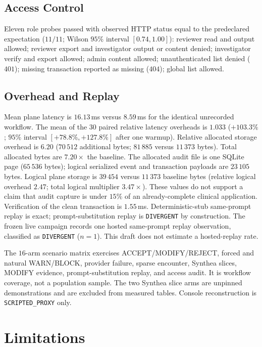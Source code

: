 \documentclass[journal]{IEEEtran}
\begin{document}
\subsection{Access Control}
Eleven role probes passed with observed HTTP status equal to the predeclared
expectation ($11/11$; Wilson $95\%$ interval $[0.74, 1.00]$): reviewer read and
output allowed; reviewer export and investigator output or content denied;
investigator verify and export allowed; admin content allowed;
unauthenticated list denied ($401$); missing transaction reported as missing
($404$); global list allowed.

\subsection{Overhead and Replay}
Mean plane latency is $16.13$\,ms versus $8.59$\,ms for the identical
unrecorded workflow. The mean of the $30$ paired relative latency overheads is
$1.033$ ($+103.3\%$; $95\%$ interval $[+78.8\%, +127.8\%]$ after one
warmup). Relative allocated storage
overhead is $6.20$ ($70\,512$ additional bytes; $81\,885$ versus
$11\,373$ bytes). Total allocated bytes are $7.20\times$ the baseline.
The allocated audit file is one SQLite page ($65\,536$ bytes); logical
serialized event and transaction payloads are $23\,105$ bytes. Logical
plane storage is $39\,454$ versus $11\,373$ baseline bytes (relative logical
overhead $2.47$; total logical multiplier $3.47\times$). These values do not
support a claim that audit capture is under $15\%$ of an already-complete
clinical application. Verification of the clean transaction is $1.55$\,ms.
Deterministic-stub same-prompt replay is exact; prompt-substitution replay is
\texttt{DIVERGENT} by construction. The frozen live campaign records one hosted
same-prompt replay observation, classified as \texttt{DIVERGENT} ($n=1$). This
draft does not estimate a hosted-replay rate.

The $16$-arm scenario matrix exercises ACCEPT/MODIFY/REJECT, forced and
natural WARN/BLOCK, provider failure, sparse encounter, Synthea slices,
MODIFY evidence, prompt-substitution replay, and access audit. It is workflow
coverage, not a population sample. The two Synthea slice arms are unpinned
demonstrations and are excluded from measured tables. Console reconstruction is
\texttt{SCRIPTED\_PROXY} only.

\section{Limitations}
\label{sec:limitations}
\end{document}
